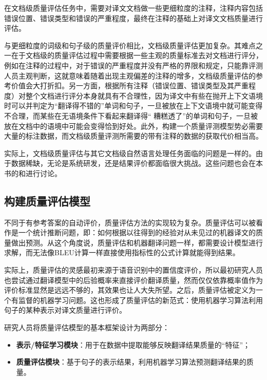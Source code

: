 \parinterval 在文档级质量评估任务中，需要对译文文档做一些更细粒度的注释，注释内容包括错误位置、错误类型和错误的严重程度，最终在注释的基础上对译文文档质量进行评估。

\parinterval 与更细粒度的词级和句子级的质量评价相比，文档级质量评估更加复杂。其难点之一在于文档级的质量评估过程中需要根据一些主观的质量标准去对文档进行评分，例如在注释的过程中，对于错误的严重程度并没有严格的界限和规定，只能靠评测人员主观判断，这就意味着随着出现主观偏差的注释的增多，文档级质量评估的参考价值会大打折扣。另一方面，根据所有注释（错误位置、错误类型及其严重程度）对整个文档进行评分本身就具有不合理性，因为译文中有些在抛开上下文语境时可以并判定为“翻译得不错的”单词和句子，一旦被放在上下文语境中就可能变得不合理，而某些在无语境条件下看起来翻译得“ 糟糕透了”的单词和句子，一旦被放在文档中的语境中可能会变得恰到好处。此外，构建一个质量评测模型势必需要大量的标注数据，而文档级质量评测所需要的带有注释的数据的获取代价相当高。

\parinterval 实际上，文档级质量评估与其它文档级自然语言处理任务面临的问题是一样的。由于数据稀缺，无论是系统研发，还是结果评价都面临很大挑战。这些问题也会在本书的{\chaptersixteen}和{\chapterseventeen}进行讨论。


\subsection{构建质量评估模型}

\parinterval 不同于有参考答案的自动评价，质量评估方法的实现较为复杂。质量评估可以被看作是一个统计推断问题，即：如何根据以往得到的经验对从未见过的机器译文的质量做出预测。从这个角度说，质量评估和机器翻译问题一样，都需要设计模型进行求解，而无法像BLEU计算一样直接使用指标性的公式计算就能得到结果。

\parinterval 实际上，质量评估的灵感最初来源于语音识别中的置信度评价，所以最初研究人员也尝试通过翻译模型中的后验概率来直接评价翻译质量，然而仅仅依靠概率值作为评价标准显然是远远不够的，其效果也让人大失所望。之后，质量评估被定义为一个有监督的机器学习问题。这也形成了质量评估的新范式：使用机器学习算法利用句子的某种表示对译文质量进行评价。

\parinterval 研究人员将质量评估模型的基本框架设计为两部分：

\begin{itemize}
\vspace{0.5em}
\item {\small\sffamily\bfseries{表示/特征学习模块}}：用于在数据中提取能够反映翻译结果质量的“特征”；
\vspace{0.5em}
\item {\small\sffamily\bfseries{质量评估模块}}：基于句子的表示结果，利用机器学习算法预测翻译结果的质量。
\end{itemize}

